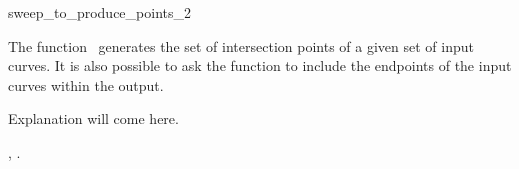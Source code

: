 

\begin{ccRefFunction}[CGAL::]{sweep_to_produce_points_2}  %


\ccDefinition
  
The function \ccRefName\ generates the set of intersection points of a
given set of input curves. It is also possible to ask the function to
include the endpoints of the input curves within the output.


   {Explanation will come here.}

\ccRequirements

\ccSeeAlso

,
.

\ccImplementation

\end{ccRefFunction}


